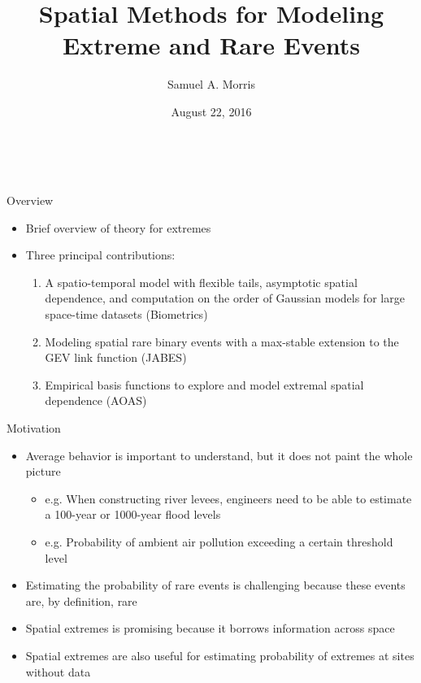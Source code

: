 \documentclass{beamer}
\title[Spatial methods for EVA] %
{
  Spatial Methods for Modeling Extreme and Rare Events
}
\author[S. Morris]{Samuel A. Morris}
\institute[]{North Carolina State University}
\date[]{August 22, 2016}
\begin{document}
\begin{frame}{\ }
\begin{center}
  \maketitle
\end{center}
\end{frame}


\begin{frame}{Overview}
	\begin{itemize} \setlength{\itemsep}{1em}
		\item Brief overview of theory for extremes
		\item Three principal contributions:
		\begin{enumerate}[1.]\setlength{\itemsep}{0.5em}
			\item A spatio-temporal model with flexible tails, asymptotic spatial dependence, and computation on the order of Gaussian models for large space-time datasets (Biometrics)
			\item Modeling spatial rare binary events with a max-stable extension to the GEV link function (JABES)
			\item Empirical basis functions to explore and model extremal spatial dependence (AOAS)
		\end{enumerate}
	\end{itemize}	
\end{frame}

\begin{frame}{Motivation}
  \begin{itemize} \setlength{\itemsep}{1em}
    \item Average behavior is important to understand, but it does not paint the whole picture
    \begin{itemize}
      \item e.g. When constructing river levees, engineers need to be able to estimate a 100-year or 1000-year flood levels
      \item e.g. Probability of ambient air pollution exceeding a certain threshold level
    \end{itemize}
    \item Estimating the probability of rare events is challenging because these events are, by definition, rare
    \item Spatial extremes is promising because it borrows information across space
    \item Spatial extremes are also useful for estimating probability of extremes at sites without data
  \end{itemize}
\end{frame}
\end{document}
